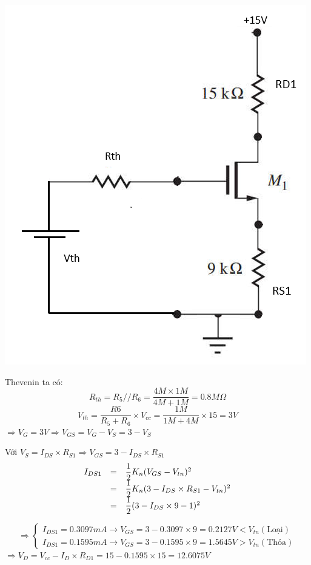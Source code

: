 \begin{itemize}[label=-]
\begin{minipage}{0.4\linewidth}
		\includegraphics[width=.8\linewidth]{./my-chapters/my-images/Question6/DC_tang1 - Copy.png}
	\end{minipage}
	
	Thevenin ta có:
		\[ R_{th} = R_{5}//R_{6} = \dfrac{4M \times 1M}{4M + 1M} = 0.8M \Omega \]
		\[ V_{th} = \dfrac{R6}{R_{5} + R_{6}}\times V_{cc} = \dfrac{1M}{1M + 4M}\times 15 = 3V\]
		$\Rightarrow V_{G} = 3V \Rightarrow V_{GS} = V_{G} - V_{S} = 3 - V_{S}$
		
		Với $V_{S} = I_{DS} \times R_{S1} \Rightarrow V_{GS} = 3 - I_{DS}\times R_{S1}$
		\[ \begin{matrix}
			I_{DS1} & = & \dfrac{1}{2} K_{n} (V_{GS} - V_{tn})^{2} \hfill \\
			       & = & \dfrac{1}{2} K_{n} (3 - I_{DS}\times R_{S1} - V_{tn})^{2} \hfill \\
			       & = & \dfrac{1}{2} (3 - I_{DS}\times 9 - 1)^{2} \hfill \\ 
		\end{matrix}
		\]
		
		\[ \Rightarrow
		\begin{cases}
			I_{DS1} = 0.3097mA \rightarrow V_{GS} = 3 - 0.3097\times 9 = 0.2127V < V_{tn}(\text{Loại}) \\
			I_{DS1} = 0.1595mA \rightarrow V_{GS} = 3 - 0.1595\times 9 = 1.5645V > V_{tn}(\text{Thỏa})
		\end{cases}\]
		$ \Rightarrow V_{D} = V_{cc} - I_{D} \times R_{D1} = 15 - 0.1595\times 15 = 12.6075V $
		

\end{itemize}
